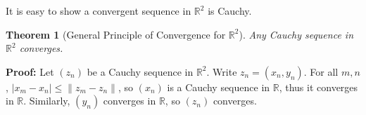 \documentclass[12pt]{article}
\newtheorem{theorem}{Theorem}[section]
\theoremstyle{definition}
\theoremstyle{remark}
\begin{document}
It is easy to show a convergent sequence in $\mathbb{R}^2$ is Cauchy.

\begin{theorem}[General Principle of Convergence for $\mathbb{R}^2$]
\item
	Any Cauchy sequence in $\mathbb{R}^2$ converges.
\end{theorem}

\begin{adjustbox}{minipage = \columnwidth - 25.5pt, margin=1em, frame=1pt, margin=0em}
	\textbf{Proof:} Let $(z_n)$ be a Cauchy sequence in $\mathbb{R}^2$. Write $z_n = (x_n, y_n)$. For all $m, n$, $|x_m - x_n| \leq \|z_m - z_n\|$, so $(x_n)$ is a Cauchy sequence in $\mathbb{R}$, thus it converges in $\mathbb{R}$. Similarly, $(y_n)$ converges in $\mathbb{R}$, so $(z_n)$ converges.
\end{adjustbox}


\newpage

\printindex
\end{document}
